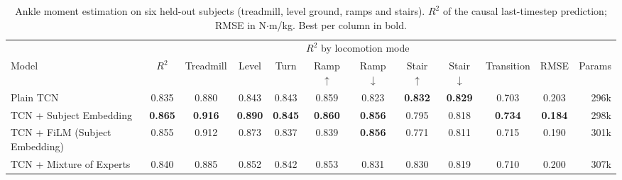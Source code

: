 \begin{table}[t]
\centering
\small
\setlength{\tabcolsep}{4pt}
\begin{tabular}{l c cccccccc c r}
\toprule
 & & \multicolumn{8}{c}{$R^2$ by locomotion mode} & & \\
\cmidrule(lr){3-10}
Model & $R^2$ & Treadmill & Level & Turn & Ramp $\uparrow$ & Ramp $\downarrow$ & Stair $\uparrow$ & Stair $\downarrow$ & Transition & RMSE & Params \\
\midrule
Plain TCN & 0.835 & 0.880 & 0.843 & 0.843 & 0.859 & 0.823 & \textbf{0.832} & \textbf{0.829} & 0.703 & 0.203 & 296k \\
TCN + Subject Embedding & \textbf{0.865} & \textbf{0.916} & \textbf{0.890} & \textbf{0.845} & \textbf{0.860} & \textbf{0.856} & 0.795 & 0.818 & \textbf{0.734} & \textbf{0.184} & 298k \\
TCN + FiLM (Subject Embedding) & 0.855 & 0.912 & 0.873 & 0.837 & 0.839 & \textbf{0.856} & 0.771 & 0.811 & 0.715 & 0.190 & 301k \\
TCN + Mixture of Experts & 0.840 & 0.885 & 0.852 & 0.842 & 0.853 & 0.831 & 0.830 & 0.819 & 0.710 & 0.200 & 307k \\
\bottomrule
\end{tabular}
\caption{Ankle moment estimation on six held-out subjects (treadmill, level ground, ramps and stairs). $R^2$ of the causal last-timestep prediction; RMSE in N$\cdot$m/kg. Best per column in bold.}
\label{tab:terrain_results}
\end{table}
